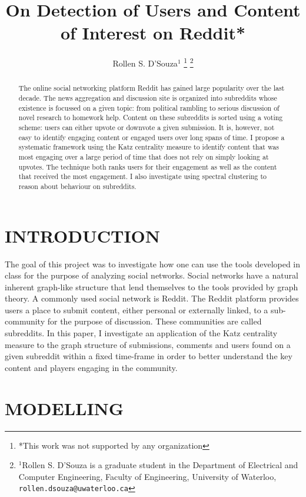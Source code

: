 \documentclass[letterpaper, 10 pt, conference]{ieeeconf}
\title{\LARGE \bf
On Detection of Users and Content of Interest on Reddit*
}
\author{Rollen S. D'Souza$^{1}$%
  \thanks{*This work was not supported by any organization}%
  \thanks{$^{1}$Rollen S. D'Souza is a graduate student in the
    Department of Electrical and Computer Engineering,
    Faculty of Engineering,
    University of Waterloo,
    \texttt{rollen.dsouza@uwaterloo.ca}
  }%
}
\theoremstyle{definition}
\begin{document}
\maketitle
\thispagestyle{empty}
\pagestyle{empty}


\begin{abstract}
  The online social networking platform Reddit has gained large popularity over the last decade. The news aggregation and discussion site is organized into subreddits whose existence is focussed on a given topic: from political rambling to serious discussion of novel research to homework help. Content on these subreddits is sorted using a voting scheme: users can either upvote or downvote a given submission. It is, however, not easy to identify engaging content or engaged users over long spans of time. I propose a systematic framework using the Katz centrality measure to identify content that was most engaging over a large period of time that does not rely on simply looking at upvotes. The technique both ranks users for their engagement as well as the content that received the most engagement. I also investigate using spectral clustering to reason about behaviour on subreddits.
\end{abstract}


\section{INTRODUCTION}
The goal of this project was to investigate how one can use the tools developed in class for the purpose of analyzing social networks. Social networks have a natural inherent graph-like structure that lend themselves to the tools provided by graph theory. A commonly used social network is Reddit. The Reddit platform provides users a place to submit content, either personal or externally linked, to a sub-community for the purpose of discussion. These communities are called subreddits. In this paper, I investigate an application of the Katz centrality measure to the graph structure of submissions, comments and users found on a given subreddit within a fixed time-frame in order to better understand the key content and players engaging in the community.

\section{MODELLING}
\end{document}
